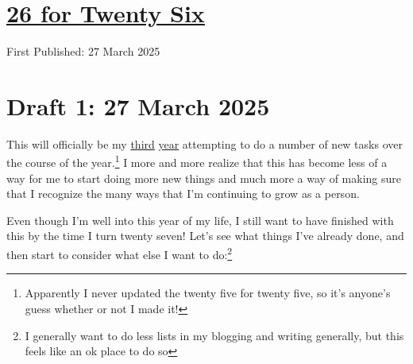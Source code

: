 \documentclass[12pt]{article}[titlepage]
\newcommand{\1}{\={a}}
\newcommand{\2}{\={e}}
\newcommand{\3}{\={\i}}
\newcommand{\4}{\=o}
\newcommand{\5}{\=u}
\newcommand{\6}{\={A}}
\renewcommand{\,}{\textsuperscript{,}}
\begin{document}
\doublespacing
\section{\href{twenty-six.html}{26 for Twenty Six}}
First Published: 27 March 2025
\section{Draft 1: 27 March 2025}  
This will officially be my \href{twenty-four.html}{third} \href{twenty-five.html}{year} attempting to do a number of new tasks over the course of the year.\footnote{Apparently I never updated the twenty five for twenty five, so it's anyone's guess whether or not I made it!}  
I more and more realize that this has become less of a way for me to start doing more new things and much more a way of making sure that I recognize the many ways that I'm continuing to grow as a person.

Even though I'm well into this year of my life, I still want to have finished with this by the time I turn twenty seven!  
Let's see what things I've already done, and then start to consider what else I want to do:\footnote{I generally want to do less lists in my blogging and writing generally, but this feels like an ok place to do so}
\end{document}
